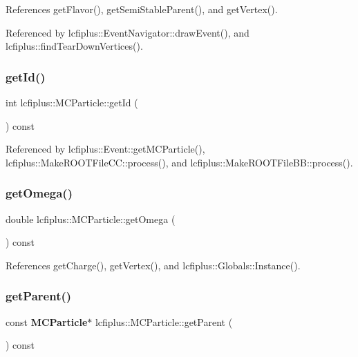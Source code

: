References get\+Flavor(), get\+Semi\+Stable\+Parent(), and get\+Vertex().



Referenced by lcfiplus\+::\+Event\+Navigator\+::draw\+Event(), and lcfiplus\+::find\+Tear\+Down\+Vertices().

\mbox{\label{classlcfiplus_1_1MCParticle_abfabefe6f391413fc9fa9bdc7d747e57}} 
\subsubsection{get\+Id()}
{\footnotesize\ttfamily int lcfiplus\+::\+M\+C\+Particle\+::get\+Id (\begin{DoxyParamCaption}{ }\end{DoxyParamCaption}) const\hspace{0.3cm}{\ttfamily [inline]}}



Referenced by lcfiplus\+::\+Event\+::get\+M\+C\+Particle(), lcfiplus\+::\+Make\+R\+O\+O\+T\+File\+C\+C\+::process(), and lcfiplus\+::\+Make\+R\+O\+O\+T\+File\+B\+B\+::process().

\mbox{\label{classlcfiplus_1_1MCParticle_a0e93d929fea5adf2b32dccb536d41527}} 
\subsubsection{get\+Omega()}
{\footnotesize\ttfamily double lcfiplus\+::\+M\+C\+Particle\+::get\+Omega (\begin{DoxyParamCaption}{ }\end{DoxyParamCaption}) const}



References get\+Charge(), get\+Vertex(), and lcfiplus\+::\+Globals\+::\+Instance().

\mbox{\label{classlcfiplus_1_1MCParticle_af8bd8866daa9b3561b48d7862cc967cd}} 
\subsubsection{get\+Parent()}
{\footnotesize\ttfamily const \textbf{ M\+C\+Particle}$\ast$ lcfiplus\+::\+M\+C\+Particle\+::get\+Parent (\begin{DoxyParamCaption}{ }\end{DoxyParamCaption}) const\hspace{0.3cm}{\ttfamily [inline]}}



